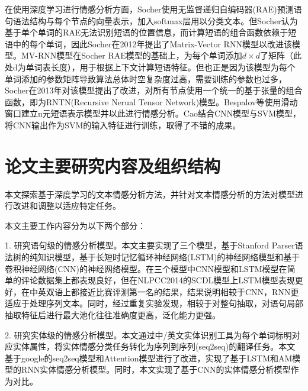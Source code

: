 在使用深度学习进行情感分析方面，Socher\cite{Socher2011}使用无监督递归自编码器(RAE)预测语句语法结构与每个节点的向量表示，加入softmax层用以分类文本。但Socher认为基于单个单词的RAE无法识别短语的位置信息，而计算短语的组合函数依赖于短语中的每个单词，因此Socher在2012年\cite{Socher2012}提出了Matrix-Vector RNN模型以改进该模型。MV-RNN模型在Socher RAE模型的基础上，为每个单词添加$d \times d$了矩阵（此处d为单词表长度），用于根据上下文计算短语特征。但也正是因为该模型为每个单词添加的参数矩阵导致算法总体时空复杂度过高，需要训练的参数也过多，Socher在2013年对该模型提出了改进\cite{Socher2013}，对所有节点使用一个统一的基于张量的组合函数，即为RNTN(Recursive Nerual Tensor Network)模型。Bespalov等\cite{Bespalov2011}使用滑动窗口建立n元短语表示模型并以此进行情感分析。Cao\cite{CaoXC15}结合CNN模型与SVM模型，将CNN输出作为SVM的输入特征进行训练，取得了不错的成果。
\section{论文主要研究内容及组织结构}
本文探索基于深度学习的文本情感分析方法，并针对文本情感分析的方法对模型进行改进和调整以适应特定任务。

本文主要工作内容分为以下两个部分：

1. 研究语句级的情感分析模型。本文主要实现了三个模型，基于Stanford Parser语法树的纯知识模型，基于长短时记忆循环神经网络(LSTM)的神经网络模型和基于卷积神经网络(CNN)的神经网络模型。在三个模型中CNN模型和LSTM模型在简单的评论数据集上都表现良好，但在NLPCC2014的SCDL模型上LSTM模型表现更好，在中英双语上都接近比赛评测第一名的结果，结果说明相较于CNN，RNN更适应于处理序列文本。同时，经过重复实验发现，相较于对整句抽取，对语句局部抽取特征后进行最大池化往往准确度更高，泛化能力更强。

2. 研究实体级的情感分析模型。本文通过中/英文实体识别工具为每个单词标明对应实体属性，将实体情感分类任务转化为序列到序列(seq2seq)的翻译任务。本文基于google的seq2seq模型\cite{seq2seq2014}和Attention模型\cite{attention2014}进行了改进，实现了基于LSTM和AM模型的RNN实体情感分析模型。同时，本文实现了基于CNN的实体情感分析模型作为对比。

